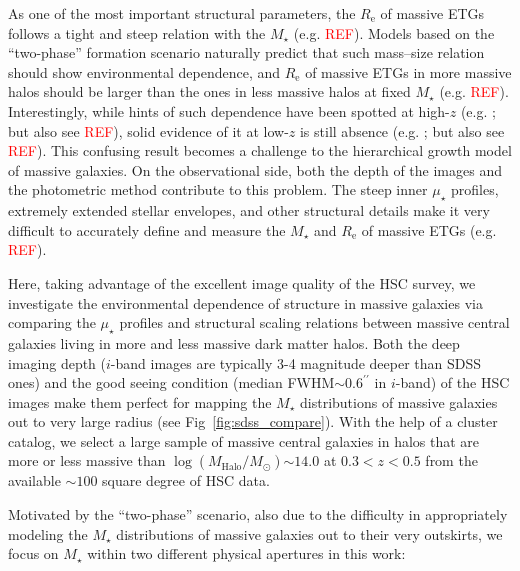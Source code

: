 \documentclass{emulateapj}
\def\arcsec{{\prime\prime}}
\def\mstar{{$M_{\star}$}}
\def\logmh{{$\log (M_{\mathrm{Halo}}/M_{\odot})$}}
\def\mden{{$\mu_{\star}$}}
\newcommand{\addref}{{\textcolor{red}{REF}}}
\begin{document}
\begin{CJK*}{UTF8}{gbsn}
    As one of the most important structural parameters, the $R_{\mathrm{e}}$ of 
    massive ETGs follows a tight and steep relation with the \mstar{} 
    (e.g. \addref{}). 
    Models based on the ``two-phase'' formation scenario naturally predict that 
    such mass--size relation should show environmental dependence, and 
    $R_{\mathrm{e}}$ of massive ETGs in more massive halos should be larger 
    than the ones in less massive halos at fixed \mstar{} (e.g. \addref{}). 
    Interestingly, while hints of such dependence have been spotted at high-$z$ 
    (e.g. \citealt{Papovich2012, Delaye2014}; but also see \addref{}), solid 
    evidence of it at low-$z$ is still absence (e.g. \citealt{Nair2010, HCompany13};
    but also see \addref{}).
    This confusing result becomes a challenge to the hierarchical growth model 
    of massive galaxies. 
    On the observational side, both the depth of the images and the photometric 
    method contribute to this problem. 
    The steep inner \mden{} profiles, extremely extended stellar envelopes, and other
    structural details make it very difficult to accurately define and measure the 
    \mstar{} and $R_{\mathrm{e}}$ of massive ETGs (e.g. \addref{}). 
       
    Here, taking advantage of the excellent image quality of the HSC survey, we 
    investigate the environmental dependence of structure in massive galaxies 
    via comparing the \mden{} profiles and structural scaling relations between 
    massive central galaxies living in more and less massive dark matter halos. 
    Both the deep imaging depth ($i$-band images are typically 3-4 magnitude deeper 
    than SDSS ones) and the good seeing condition (median FWHM$\sim 0.6^{\arcsec}$
    in $i$-band) of the HSC images make them perfect for mapping the \mstar{}
    distributions of massive galaxies out to very large radius (see 
    Fig~\ref{fig:sdss_compare}). 
    With the help of a cluster catalog, we select a large sample of massive central 
    galaxies in halos that are more or less massive than \logmh{}$\sim 14.0$ at 
    $0.3 < z < 0.5$ from the available $\sim 100$ square degree of HSC data.
    
    Motivated by the ``two-phase'' scenario, also due to the difficulty in 
    appropriately modeling the \mstar{} distributions of massive galaxies out to 
    their very outskirts, we focus on \mstar{} within two different physical apertures 
    in this work:
    

\end{CJK*}
\end{document}
